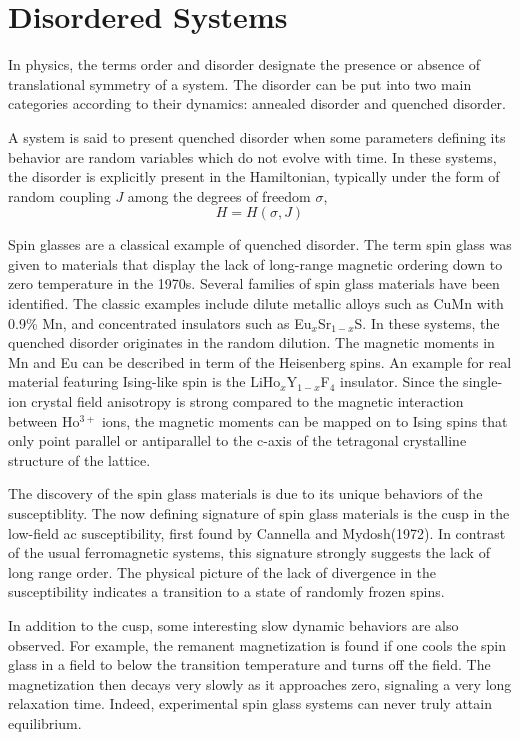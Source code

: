\section{Disordered Systems}
In physics, the terms order and disorder designate the presence or absence of 
translational symmetry of a system. The disorder can be put into two main categories 
according to their dynamics: annealed disorder and quenched disorder.

A system is said to present quenched disorder when 
some parameters defining its behavior are random variables which do not evolve 
with time. In these systems, the disorder is explicitly present in the Hamiltonian, 
typically under the form of random coupling $J$ among the degrees of freedom $\sigma$,
\begin{equation}
  \label{eq:4}
  H=H(\sigma,J)
\end{equation}

Spin glasses \cite{Binder-Young-1986} are a classical example of quenched disorder. 
The term spin glass was given to materials that display the lack of long-range
magnetic ordering down to zero temperature in the 1970s. 
Several families of spin glass materials have been identified. The classic examples include 
dilute metallic alloys such as CuMn with 0.9\% Mn, and concentrated insulators 
such as Eu$_x$Sr$_{1-x}$S. In these systems, the quenched disorder originates in the random dilution.
The magnetic moments in Mn and Eu can be described in term of the Heisenberg spins.
An example for real material featuring Ising-like spin is the 
LiHo$_x$Y$_{1-x}$F$_4$ insulator. Since the single-ion crystal field anisotropy
is strong compared to the magnetic interaction between Ho$^{3+}$ ions, the magnetic 
moments can be mapped on to Ising spins that only point parallel or antiparallel
to the c-axis of the tetragonal crystalline structure of the lattice. 

The discovery of the spin glass materials is due to its unique behaviors of
the susceptiblity. The now defining signature of spin glass materials is 
the cusp in the low-field ac susceptibility, first found by Cannella and Mydosh(1972).
In contrast of the usual ferromagnetic systems, this signature strongly 
suggests the lack of long range order. The physical picture of the lack 
of divergence in the susceptibility indicates a transition to a state of randomly 
frozen spins. 

In addition to the cusp, some interesting slow dynamic 
behaviors are also observed. For example, the remanent magnetization is found 
if one cools the spin glass in a field to below the transition temperature and 
turns off the field. The magnetization then decays very slowly as it approaches 
zero, signaling a very long relaxation time. Indeed, experimental spin glass
systems can never truly attain equilibrium. 

